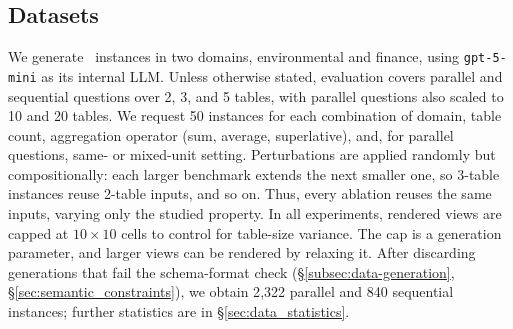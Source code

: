 \subsection{Datasets}

We generate \name\ instances in two domains, environmental and finance, using \texttt{gpt-5-mini} as its internal LLM. Unless otherwise stated, evaluation covers parallel and sequential questions over 2, 3, and 5 tables, with parallel questions also scaled to 10 and 20 tables. We request 50 instances for each combination of domain, table count, aggregation operator (sum, average, superlative), and, for parallel questions, same- or mixed-unit setting. Perturbations are applied randomly but compositionally: each larger benchmark extends the next smaller one, so 3-table instances reuse 2-table inputs, and so on. Thus, every ablation reuses the same inputs, varying only the studied property. In all experiments, rendered views are capped at $10 \times 10$ cells to control for table-size variance. The cap is a generation parameter, and larger views can be rendered by relaxing it. 
After discarding generations that fail the schema-format check (\S\ref{subsec:data-generation}, \S\ref{sec:semantic_constraints}), we obtain 2{,}322 parallel and 840 sequential instances; further statistics are in \S\ref{sec:data_statistics}.


